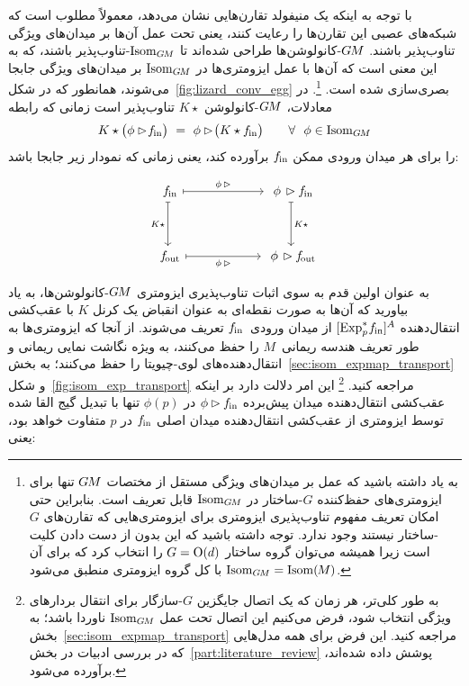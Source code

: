با توجه به اینکه یک منیفولد تقارن‌هایی نشان می‌دهد، معمولاً مطلوب است که شبکه‌های عصبی این تقارن‌ها را رعایت کنند، یعنی تحت عمل آن‌ها بر میدان‌های ویژگی تناوب‌پذیر باشند.
$G\mkern-1.4muM$-کانولوشن‌ها طراحی شده‌اند تا $\operatorname{Isom}_{G\mkern-1.4muM}$-تناوب‌پذیر باشند، که به این معنی است که آن‌ها با عمل ایزومتری‌ها در $\operatorname{Isom}_{G\mkern-1.4muM}$ بر میدان‌های ویژگی جابجا می‌شوند، همانطور که در شکل~\ref{fig:lizard_conv_egg} بصری‌سازی شده است.%
\footnote{
	به یاد داشته باشید که عمل بر میدان‌های ویژگی مستقل از مختصات $G\mkern-1.4muM$ تنها برای ایزومتری‌های حفظ‌کننده $G$-ساختار در $\operatorname{Isom}_{G\mkern-1.4muM}$ قابل تعریف است.
	بنابراین حتی امکان تعریف مفهوم تناوب‌پذیری ایزومتری برای ایزومتری‌هایی که تقارن‌های $G$-ساختار نیستند وجود ندارد.
	توجه داشته باشید که این بدون از دست دادن کلیت است زیرا همیشه می‌توان گروه ساختار $G=\operatorname{O}(d)$ را انتخاب کرد که برای آن $\operatorname{Isom}_{G\mkern-1.4muM}=\operatorname{Isom}(\mkern-1.5mu M \mkern-.5mu)$ با کل گروه ایزومتری منطبق می‌شود.
}.
در معادلات، $G\mkern-1.4muM$-کانولوشن $K\star$ تناوب‌پذیر است زمانی که رابطه
\begin{align}\label{eq:isometry_equivariance_conv_def_33}
	K \star \big( \phi\rhd\! \fin \big) \ =\ \phi\rhd\! \big( K \star \fin \big)
	\qquad \forall\ \ \phi\in \IsomGM
\end{align}
را برای هر میدان ورودی ممکن $f_\textup{\;\!\!in}$ برآورده کند، یعنی زمانی که نمودار زیر جابجا باشد:

\begin{equation}\label{cd:isometry_equivariance_conv_mapsto}
	\begin{tikzcd}[column sep=60pt, row sep=35, font=\normalsize]
		\fin
		\arrow[r, "\phi\,\rhd", mapsto]
		\arrow[d, "K\star"', mapsto]
		&
		\phi\,\rhd \fin
		\arrow[d, "K\star", mapsto]
		\\
		\fout
		\arrow[r, "\phi\,\rhd"', mapsto]
		&
		\phi\,\rhd \fout
	\end{tikzcd}
\end{equation}


به عنوان اولین قدم به سوی اثبات تناوب‌پذیری ایزومتری $G\mkern-1.4muM$-کانولوشن‌ها، به یاد بیاورید که آن‌ها به صورت نقطه‌ای به عنوان انقباض یک کرنل $K$ با عقب‌کشی انتقال‌دهنده $[\operatorname{Exp}^*_p\mkern-2mu f_\textup{\;\!\!in}]^A$ از میدان ورودی~$f_\textup{\;\!\!in}$ تعریف می‌شوند.
از آنجا که ایزومتری‌ها به طور تعریف هندسه ریمانی~$M$ را حفظ می‌کنند، به ویژه نگاشت نمایی ریمانی و انتقال‌دهنده‌های لوی-چیویتا را حفظ می‌کنند؛ به بخش~\ref{sec:isom_expmap_transport} و شکل~\ref{fig:isom_exp_transport} مراجعه کنید.%
\footnote{
	به طور کلی‌تر، هر زمان که یک اتصال جایگزین $G$-سازگار برای انتقال بردارهای ویژگی انتخاب شود، فرض می‌کنیم این اتصال تحت عمل $\operatorname{Isom}_{G\mkern-1.4muM}$ ناوردا باشد؛ به بخش~\ref{sec:isom_expmap_transport} مراجعه کنید.
	این فرض برای همه مدل‌هایی که در بررسی ادبیات در بخش~\ref{part:literature_review} پوشش داده شده‌اند، برآورده می‌شود.
}
این امر دلالت دارد بر اینکه عقب‌کشی انتقال‌دهنده میدان پیش‌برده $\phi\rhd f_\textup{\;\!\!in}$ در $\phi(p)$ تنها با تبدیل گیج القا شده توسط ایزومتری از عقب‌کشی انتقال‌دهنده میدان اصلی $f_\textup{\;\!\!in}$ در $p$ متفاوت خواهد بود، یعنی:

